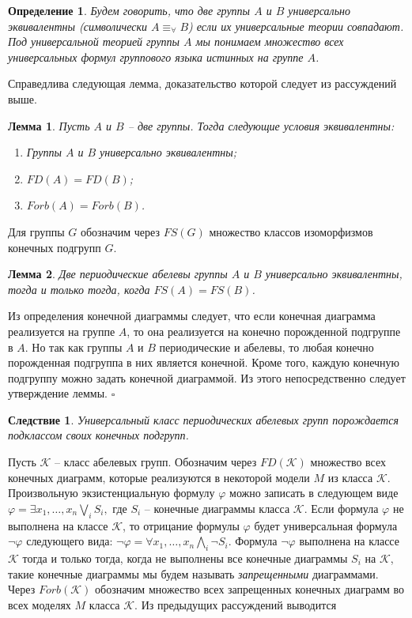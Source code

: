 \documentclass[a4paper,11pt,twoside]{article}
\newtheorem{lemma}{Лемма}[section]
\newtheorem{corollary}{Следствие}[section]
\newtheorem{definition}{Определение}[section]
\def\proof{{\noindent{\bf Доказательство.}} }
\def\K{{\mathcal{K}}}
\begin{document}
\begin{definition}
Будем говорить, что две группы $A$ и $B$ универсально эквивалентны (символически $A \equiv_\forall B$) если их универсальные теории совпадают. Под универсальной теорией группы $A$ мы понимаем множество всех универсальных формул группового языка истинных на группе $A$.
\end{definition}
Справедлива следующая лемма, доказательство которой следует из рассуждений выше.

\begin{lemma}\label{lemma:UnivEquivForb}
Пусть $A$ и $B$ -- две группы. Тогда следующие условия эквивалентны:
\begin{enumerate}
\item Группы $A$ и $B$ универсально эквивалентны;
\item $FD(A) = FD(B)$;
\item $Forb(A) = Forb(B)$.
\end{enumerate}
\end{lemma}

Для группы $G$ обозначим через $FS(G)$ множество классов изоморфизмов конечных подгрупп $G$.

\begin{lemma}\label{lemma:UnivEquivFS}
Две периодические абелевы группы $A$ и $B$ универсально эквивалентны, тогда и только тогда, когда $FS(A) = FS(B)$.
\end{lemma}
\proof Из определения конечной диаграммы следует, что если конечная диаграмма реализуется на группе $A$, то она реализуется на конечно порожденной подгруппе в $A$. Но так как группы $A$ и $B$ периодические и абелевы, то любая конечно порожденная подгруппа в них является конечной. Кроме того, каждую конечную подгруппу можно задать конечной диаграммой. Из этого непосредственно следует утверждение леммы. $\square$

\begin{corollary}\label{cor:ClassPerdiodicAbelinaGroup}
Универсальный класс периодических абелевых групп порождается подклассом своих конечных подгрупп.
\end{corollary}

Пусть $\K$ -- класс абелевых групп. Обозначим через $FD(\K)$ множество всех конечных диаграмм, которые реализуются в некоторой модели $M$ из класса $\K$. Произвольную экзистенциальную формулу $\varphi$ можно записать в следующем виде $\varphi = \exists x_1, \ldots, x_n \bigvee\limits_{i} S_i,$ где $S_i$ -- конечные диаграммы класса $\K$. Если формула $\varphi$ не выполнена на классе $\K$, то отрицание формулы $\varphi$ будет универсальная формула $\neg \varphi$ следующего вида: $\neg \varphi = \forall x_1, \ldots, x_n \bigwedge\limits_{i} \neg S_i$. Формула $\neg \varphi$ выполнена на классе $\K$ тогда и только тогда, когда не выполнены все конечные диаграммы $S_i$ на $\K$, такие конечные диаграммы мы будем называть \textit{запрещенными} диаграммами. Через $Forb(\K)$ обозначим множество всех запрещенных конечных диаграмм во всех моделях $M$ класса $\K$. Из предыдущих рассуждений выводится
\end{document}
